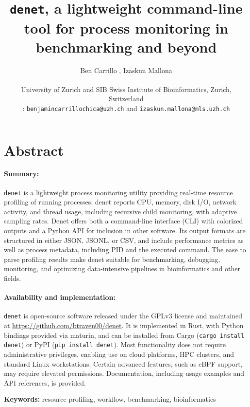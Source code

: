 \documentclass[10pt]{article}
\title{\texttt{denet}, a lightweight command-line tool for process monitoring in benchmarking and beyond}
\author{Ben Carrillo \orcidlink{0009-0003-5704-4151}, Izaskun Mallona \orcidlink{0000-0002-2853-7526}\\
\\
University of Zurich and SIB Swiss Institute of Bioinformatics, Zurich, Switzerland \\ 
{ \Letter: \texttt{benjamincarrillochica@uzh.ch} and \texttt{izaskun.mallona@mls.uzh.ch}}
}
\date{}
\begin{document}
\maketitle
	
\section*{Abstract} %

\paragraph{Summary:} \texttt{denet} is a lightweight process monitoring utility providing real-time resource profiling of running processes. denet reports CPU, memory, disk I/O, network activity, and thread usage, including recursive child monitoring, with adaptive sampling rates. Denet offers both a command-line interface (CLI) with colorized outputs and a Python API for inclusion in other software. Its output formats are structured in either JSON, JSONL, or CSV, and include performance metrics as well as process metadata, including PID and the executed command. The ease to parse profiling results make denet suitable for benchmarking, debugging, monitoring, and optimizing data-intensive pipelines in bioinformatics and other fields. 

\paragraph{Availability and implementation:} \texttt{denet} is open-source software released under the GPLv3 license and maintained at \url{https://github.com/btraven00/denet}. It is implemented in Rust, with Python bindings provided via maturin, and can be installed from Cargo (\texttt{cargo install denet}) or PyPI (\texttt{pip install denet}). Most functionality does not require administrative privileges, enabling use on cloud platforms, HPC clusters, and standard Linux workstations. Certain advanced features, such as eBPF support, may require elevated permissions. Documentation, including usage examples and API references, is provided.

\vspace{0.5cm}

\noindent\textbf{Keywords:} resource profiling, workflow, benchmarking, bioinformatics

\end{document}
